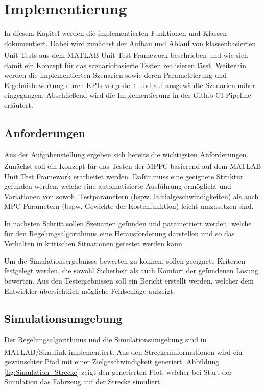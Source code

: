 \chapter{Implementierung} \label{chap:Implementierung}
\thispagestyle{empty}

In diesem Kapitel werden die implementierten Funktionen und Klassen dokumentiert. Dabei wird zunächst der Aufbau und Ablauf von klassenbasierten Unit-Tests aus dem MATLAB\textsuperscript{\textregistered} Unit Test Framework beschrieben und wie sich damit ein Konzept für das szenariobasierte Testen realisieren lässt. Weiterhin werden die implementierten Szenarien sowie deren Parametrierung und Ergebnisbewertung durch KPIs vorgestellt und auf ausgewählte Szenarien näher eingegangen. Abschließend wird die Implementierung in der Gitlab CI Pipeline erläutert.

\section{Anforderungen} \label{sec:Anforderungen}

Aus der Aufgabenstellung ergeben sich bereits die wichtigsten Anforderungen. Zunächst soll ein Konzept für das Testen der MPFC basierend auf dem MATLAB\textsuperscript{\textregistered} Unit Test Framework erarbeitet werden. Dafür muss eine geeignete Struktur gefunden werden, welche eine automatisierte Ausführung ermöglicht und Variationen von sowohl Testparametern (bspw. Initialgeschwindigkeiten) als auch MPC-Parametern (bspw. Gewichte der Kostenfunktion) leicht umzusetzen sind. 

In nächsten Schritt sollen Szenarien gefunden und parametriert werden, welche für den Regelungsalgorithmus eine Herausforderung darstellen und so das Verhalten in kritischen Situationen getestet werden kann.

Um die Simulationsergebnisse bewerten zu können, sollen geeignete Kriterien festgelegt werden, die sowohl Sicherheit als auch Komfort der gefundenen Lösung bewerten. Aus den Testergebnissen soll ein Bericht erstellt werden, welcher dem Entwickler übersichtlich mögliche Fehlschläge aufzeigt.

\section{Simulationsumgebung} \label{sec:Simulationsumgebung}

Der Regelungsalgorithmus und die Simulationsumgebung sind in MATLAB\textsuperscript{\textregistered}/Simulink implementiert. Aus den Streckeninformationen wird ein gewünschter Pfad mit einer Zielgeschwindigkeit generiert. Abbildung \ref{fig:Simulation_Strecke} zeigt den generierten Plot, welcher bei Start der Simulation das Fahrzeug auf der Strecke simuliert.

